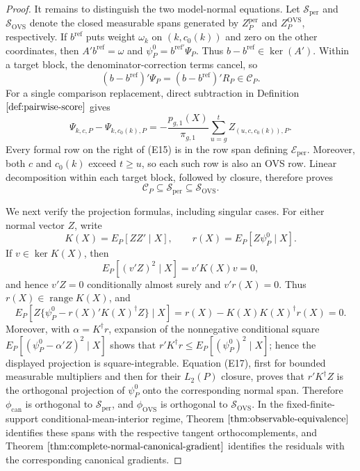 \documentclass{article}
\begin{document}
\begin{proof}
It remains to distinguish the two model-normal equations.  Let \(\mathscr S_{\mathrm{per}}\) and \(\mathscr S_{\mathrm{OVS}}\) denote the closed measurable spans generated by \(Z_P^{\mathrm{per}}\) and \(Z_P^{\mathrm{OVS}}\), respectively.  If \(b^{\mathrm{ref}}\) puts weight \(\omega_k\) on \((k,c_0(k))\) and zero on the other coordinates, then \(A'b^{\mathrm{ref}}=\omega\) and \(\psi_P^0=b^{\mathrm{ref}\prime}\Psi_P\).  Thus \(b-b^{\mathrm{ref}}\in\ker(A')\).  Within a target block, the denominator-correction terms cancel, so
\[
 (b-b^{\mathrm{ref}})'\Psi_P=(b-b^{\mathrm{ref}})'R_P\in\mathcal C_P.
\tag{E14}
\]
For a single comparison replacement, direct subtraction in Definition \(\ref{def:pairwise-score}\) gives
\[
 \Psi_{k,c,P}-\Psi_{k,c_0(k),P}
 =-\frac{p_{g,1}(X)}{\pi_{g,1}}
   \sum_{u=g}^{t} Z_{(u,c,c_0(k)),P}.
\tag{E15}
\]
Every formal row on the right of (E15) is in the row span defining \(\mathcal E_{\mathrm{per}}\).  Moreover, both \(c\) and \(c_0(k)\) exceed \(t\ge u\), so each such row is also an OVS row.  Linear decomposition within each target block, followed by closure, therefore proves
\[
 \mathcal C_P\subseteq\mathscr S_{\mathrm{per}}
 \subseteq\mathscr S_{\mathrm{OVS}}.
\tag{E16}
\]

We next verify the projection formulas, including singular cases.  For either normal vector \(Z\), write
\[
 K(X)=E_P[ZZ'\mid X],\qquad r(X)=E_P[Z\psi_P^0\mid X].
\]
If \(v\in\ker K(X)\), then
\[
 E_P[(v'Z)^2\mid X]=v'K(X)v=0,
\]
and hence \(v'Z=0\) conditionally almost surely and \(v'r(X)=0\).  Thus \(r(X)\in\operatorname{range}K(X)\), and
\[
 E_P\!\left[Z\{\psi_P^0-r(X)'K(X)^\dagger Z\}\mid X\right]
 =r(X)-K(X)K(X)^\dagger r(X)=0.
\tag{E17}
\]
Moreover, with \(\alpha=K^\dagger r\), expansion of the nonnegative conditional square \(E_P[(\psi_P^0-\alpha'Z)^2\mid X]\) shows that \(r'K^\dagger r\le E_P[(\psi_P^0)^2\mid X]\); hence the displayed projection is square-integrable.  Equation (E17), first for bounded measurable multipliers and then for their \(L_2(P)\) closure, proves that \(r'K^\dagger Z\) is the orthogonal projection of \(\psi_P^0\) onto the corresponding normal span.  Therefore \(\phi_{\mathrm{can}}\) is orthogonal to \(\mathscr S_{\mathrm{per}}\), and \(\phi_{\mathrm{OVS}}\) is orthogonal to \(\mathscr S_{\mathrm{OVS}}\).  In the fixed-finite-support conditional-mean-interior regime, Theorem \(\ref{thm:observable-equivalence}\) identifies these spans with the respective tangent orthocomplements, and Theorem \(\ref{thm:complete-normal-canonical-gradient}\) identifies the residuals with the corresponding canonical gradients.


\end{proof}
\end{document}
